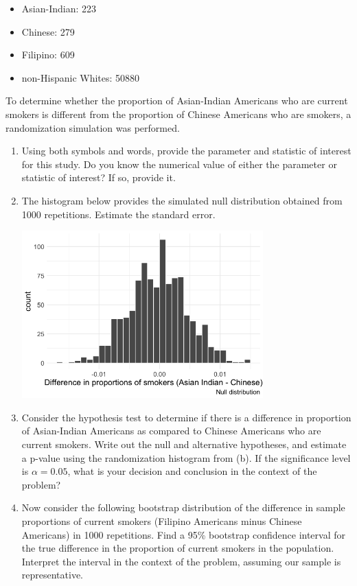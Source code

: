 \documentclass[
  letterpaper,
  DIV=11,
  numbers=noendperiod]{scrartcl}
\begin{document}
\begin{enumerate}
  \begin{itemize}
  \item
    Asian-Indian: 223
  \item
    Chinese: 279
  \item
    Filipino: 609
  \item
    non-Hispanic Whites: 50880
  \end{itemize}

  To determine whether the proportion of Asian-Indian Americans who are
  current smokers is different from the proportion of Chinese Americans
  who are smokers, a randomization simulation was performed.

  \begin{enumerate}
  \def\labelenumii{\alph{enumii}.}
  \item
    Using both symbols and words, provide the parameter and statistic of
    interest for this study. Do you know the numerical value of either
    the parameter or statistic of interest? If so, provide it.
  \item
    The histogram below provides the simulated null distribution
    obtained from 1000 repetitions. Estimate the standard error.

    \includegraphics[width=3.65625in,height=\textheight]{images/14-asian-tobacco-null.png}
  \item
    Consider the hypothesis test to determine if there is a difference
    in proportion of Asian-Indian Americans as compared to Chinese
    Americans who are current smokers. Write out the null and
    alternative hypotheses, and estimate a p-value using the
    randomization histogram from (b). If the significance level is
    \(\alpha = 0.05\), what is your decision and conclusion in the
    context of the problem?
  \item
    Now consider the following bootstrap distribution of the difference
    in sample proportions of current smokers (Filipino Americans minus
    Chinese Americans) in 1000 repetitions. Find a 95\% bootstrap
    confidence interval for the true difference in the proportion of
    current smokers in the population. Interpret the interval in the
    context of the problem, assuming our sample is representative.


\end{enumerate}
\end{enumerate}
\end{document}
